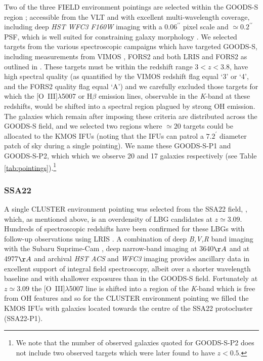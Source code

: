 \documentclass[fleqn,usenatbib]{mnras}
\begin{document}
Two of the three FIELD environment pointings are selected within the GOODS-S region \citep{Guo2013}; accessible from the VLT and with excellent multi-wavelength coverage, including deep {\em HST WFC3 F160W} imaging with a $0.06^{\prime\prime}$ pixel scale and $\simeq0.2^{\prime\prime}$ PSF, which is well suited for constraining galaxy morphology \citep{Grogin2011,Koekemoer2011}.
We selected targets from the various spectroscopic campaigns which have targeted GOODS-S, including measurements from VIMOS \citep{Balestra2010,Cassata2014}, FORS2 \citep{Vanzella2005,Vanzella2006,Vanzella2008} and both LRIS and FORS2 as outlined in \cite{Wuyts2009}.
These targets must be within the redshift range $3 < z < 3.8$, have high spectral quality (as quantified by the VIMOS redshift flag equal `3' or `4', and the FORS2 quality flag equal `A') and we carefully excluded those targets for which the [O~{\sc III}]$\lambda$5007 or H$\beta$ emission lines, observable in the {\it K}-band at these redshifts, would be shifted into a spectral region plagued by strong OH emission.
The galaxies which remain after imposing these criteria are distributed across the GOODS-S field, and we selected two regions where $\simeq20$ targets could be allocated to the KMOS IFUs (noting that the IFUs can patrol a $7.2^{\prime}$ diameter patch of sky during a single pointing).
We name these GOODS-S-P1 and GOODS-S-P2, which which we observe 20 and 17 galaxies respectively (see Table \ref{tab:pointings}).\footnote{We note that the number of observed galaxies quoted for GOODS-S-P2 does not include two observed targets which were later found to have $z < 0.5$.}

\subsubsection{SSA22}\label{subsubsec:sample_selection_ssa}
A single CLUSTER environment pointing was selected from the SSA22 field, \citep{Steidel1998,Steidel2000,Steidel2003,Shapley2003}, which, as mentioned above, is an overdensity of LBG candidates at $z\simeq3.09$.
Hundreds of spectroscopic redshifts have been confirmed for these LBGs with follow-up observations using LRIS \citep{Shapley2003,Nestor2013}.
A combination of deep {\em B,V,R} band imaging with the Subaru Suprime-Cam \citep{Matsuda2004}, deep narrow-band imaging at 3640$\AA$ \citep{Matsuda2004} and at 4977$\AA$ \citep{Nestor2011,Yamada2012a} and archival {\em HST ACS} and {\it WFC3} imaging provides ancillary data in excellent support of integral field spectroscopy, albeit over a shorter wavelength baseline and with shallower exposures than in the GOODS-S field.
Fortunately at $z\simeq3.09$ the [O~{\sc III}]$\lambda$5007 line is shifted into a region of the {\it K}-band which is free from OH features and so for the CLUSTER environment pointing we filled the KMOS IFUs with galaxies located towards the centre of the SSA22 protocluster (SSA22-P1).
\end{document}
